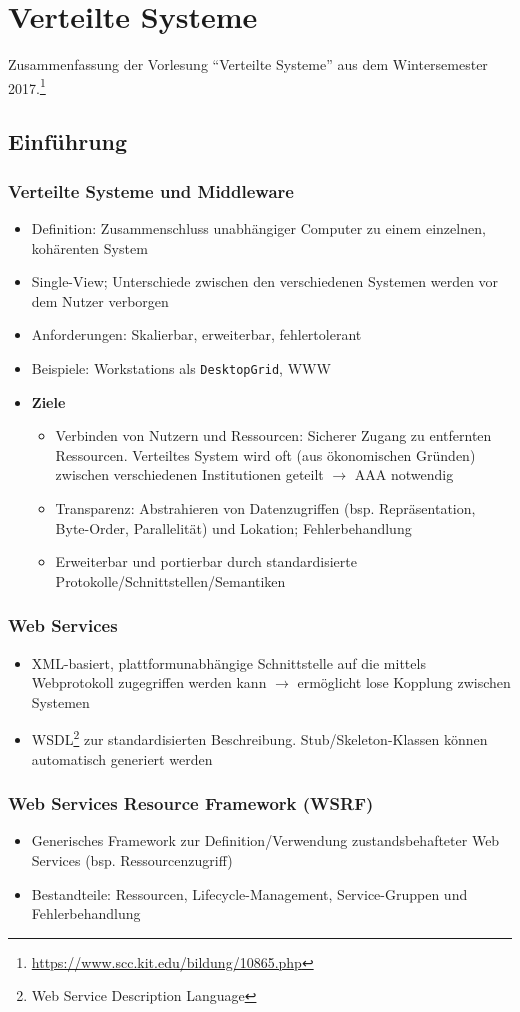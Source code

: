 \chapter{Verteilte Systeme}

Zusammenfassung der Vorlesung "`Verteilte Systeme"' aus dem Wintersemester 2017.\footnote{\url{https://www.scc.kit.edu/bildung/10865.php}}

\section{Einführung}

\subsection{Verteilte Systeme und Middleware}
\begin{itemize}
	\item Definition: Zusammenschluss unabhängiger Computer zu einem einzelnen, kohärenten System
	\item Single-View; Unterschiede zwischen den verschiedenen Systemen werden vor dem Nutzer verborgen
	\item Anforderungen: Skalierbar, erweiterbar, fehlertolerant
	\item Beispiele: Workstations als \texttt{DesktopGrid}, WWW
	\item \textbf{Ziele}
	\begin{itemize}
		\item Verbinden von Nutzern und Ressourcen: Sicherer Zugang zu entfernten Ressourcen. Verteiltes System wird oft (aus ökonomischen Gründen) zwischen verschiedenen Institutionen geteilt \(\rightarrow\) AAA notwendig
		\item Transparenz: Abstrahieren von Datenzugriffen (bsp. Repräsentation, Byte-Order, Parallelität) und Lokation; Fehlerbehandlung
		\item Erweiterbar und portierbar durch standardisierte Protokolle/Schnittstellen/Semantiken
	\end{itemize}
\end{itemize}


\subsection{Web Services}
\begin{itemize}
	\item XML-basiert, plattformunabhängige Schnittstelle auf die mittels Webprotokoll zugegriffen werden kann \(\rightarrow\) ermöglicht lose Kopplung zwischen Systemen
	\item WSDL\footnote{Web Service Description Language} zur standardisierten Beschreibung. Stub/Skeleton-Klassen können automatisch generiert werden
\end{itemize}


\subsection{Web Services Resource Framework (WSRF)}
\begin{itemize}
	\item Generisches Framework zur Definition/Verwendung zustandsbehafteter Web Services (bsp. Ressourcenzugriff)
	\item Bestandteile: Ressourcen, Lifecycle-Management, Service-Gruppen und Fehlerbehandlung
\end{itemize}